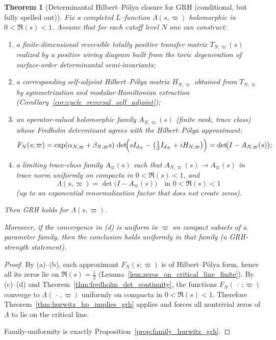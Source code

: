 \documentclass[11pt,oneside]{amsbook}
\numberwithin{equation}{section}
\theoremstyle{plain}
\newtheorem{theorem}{Theorem}[section]
\theoremstyle{definition}
\theoremstyle{remark}
\begin{document}
\begin{theorem}[Determinantal Hilbert--Pólya closure for GRH (conditional, but fully spelled out)]
\label{thm:determinantal_HP_GRH}
Fix a completed $L$--function $\Lambda(s,\varpi)$ holomorphic in $0<\Re(s)<1$.
Assume that for each cutoff level $N$ one can construct:
\begin{enumerate}[label=(\alph*)]
\item a finite-dimensional reversible totally positive transfer matrix $T_{N,\varpi}(s)$ realized by a positive wiring diagram built from the toric degeneration of surface-order determinantal semi-invariants;
\item a corresponding self-adjoint Hilbert--Pólya matrix $H_{N,\varpi}$ obtained from $T_{N,\varpi}$ by symmetrization and modular-Hamiltonian extraction (Corollary~\ref{cor:cycle_reversal_self_adjoint});
\item an operator-valued holomorphic family $A_{N,\varpi}(s)$ (finite rank, trace class) whose Fredholm determinant agrees with the Hilbert--Pólya approximant:
\[
F_N(s;\varpi)=\exp(\alpha_{N,\varpi}+\beta_{N,\varpi}s)\,
\det\!\Bigl(sI_{d_N}-\bigl(\tfrac12 I_{d_N}+ i H_{N,\varpi}\bigr)\Bigr)
= \det\!\bigl(I-A_{N,\varpi}(s)\bigr);
\]
\item a limiting trace-class family $A_\varpi(s)$ such that $A_{N,\varpi}(s)\to A_\varpi(s)$ in trace norm uniformly on compacta in $0<\Re(s)<1$, and
\[
\Lambda(s,\varpi)=\det\!\bigl(I-A_\varpi(s)\bigr)
\quad\text{in }0<\Re(s)<1
\]
(up to an exponential renormalization factor that does not create zeros).
\end{enumerate}
Then GRH holds for $\Lambda(s,\varpi)$.

Moreover, if the convergence in (d) is uniform in $\varpi$ on compact subsets of a parameter family, then the conclusion holds uniformly in that family (a GRH-strength statement).
\end{theorem}

\begin{proof}
By (a)--(b), each approximant $F_N(s;\varpi)$ is of Hilbert--Pólya form, hence all its zeros lie on $\Re(s)=\tfrac12$ (Lemma~\ref{lem:zeros_on_critical_line_finite}).
By (c)--(d) and Theorem~\ref{thm:fredholm_det_continuity}, the functions $F_N(\,\cdot\,;\varpi)$ converge to $\Lambda(\,\cdot\,,\varpi)$ uniformly on compacta in $0<\Re(s)<1$.
Therefore Theorem~\ref{thm:hurwitz_hp_implies_grh} applies and forces all nontrivial zeros of $\Lambda$ to lie on the critical line.

Family-uniformity is exactly Proposition~\ref{prop:family_hurwitz_grh}.
\end{proof}
\end{document}
